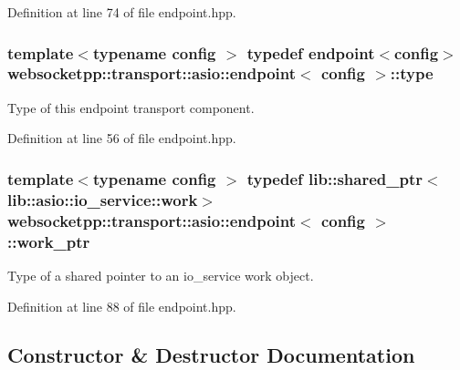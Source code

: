 Definition at line 74 of file endpoint.\+hpp.

\hypertarget{classwebsocketpp_1_1transport_1_1asio_1_1endpoint_a86283417bb35f13b9a1d9795f5fcf077}{}
\subsubsection[{type}]{\setlength{\rightskip}{0pt plus 5cm}template$<$typename config $>$ typedef {\bf endpoint}$<$config$>$ {\bf websocketpp\+::transport\+::asio\+::endpoint}$<$ config $>$\+::{\bf type}}\label{classwebsocketpp_1_1transport_1_1asio_1_1endpoint_a86283417bb35f13b9a1d9795f5fcf077}


Type of this endpoint transport component. 



Definition at line 56 of file endpoint.\+hpp.

\hypertarget{classwebsocketpp_1_1transport_1_1asio_1_1endpoint_ac730e8330bb982f9144127e9d66d0a23}{}
\subsubsection[{work\+\_\+ptr}]{\setlength{\rightskip}{0pt plus 5cm}template$<$typename config $>$ typedef lib\+::shared\+\_\+ptr$<$lib\+::asio\+::io\+\_\+service\+::work$>$ {\bf websocketpp\+::transport\+::asio\+::endpoint}$<$ config $>$\+::{\bf work\+\_\+ptr}}\label{classwebsocketpp_1_1transport_1_1asio_1_1endpoint_ac730e8330bb982f9144127e9d66d0a23}


Type of a shared pointer to an io\+\_\+service work object. 



Definition at line 88 of file endpoint.\+hpp.



\subsection{Constructor \& Destructor Documentation}
\hypertarget{classwebsocketpp_1_1transport_1_1asio_1_1endpoint_a4da0f956f7962c68230676aa1e19e96d}{}
